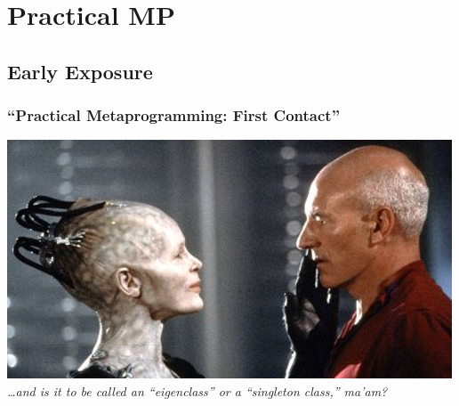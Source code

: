 \documentclass[slidestop,compress,mathserif]{beamer}
\begin{document}
\section{Practical MP} %
\label{sub:practical_metaprogramming}

\subsection{Early Exposure} %
\label{sub:early_exposure}

\begin{frame}
	\frametitle{``Practical Metaprogramming:  First Contact''}
	\includegraphics[scale=0.55]{img/first_contact.jpg} \\
	\emph{\ldots and is it to be called an ``eigenclass'' or a ``singleton class,'' ma'am?}
\end{frame}
\end{document}
